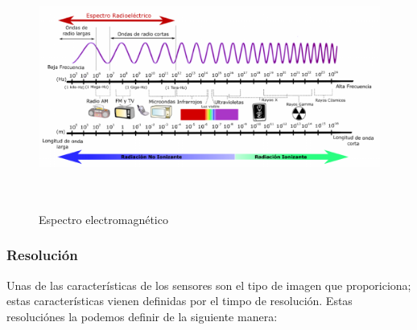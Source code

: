 \begin{figure}[H] \centering
  \includegraphics[height=8cm,keepaspectratio=true,clip=true]{imagenes/MarcoTeorico/espectro-electro.png}
  \caption{Espectro electromagnético \citep{https://iie.fing.edu.uy/proyectos/esopo/eem/}}\label{Fig:espectro-electromagnetico}
\end{figure}


\subsubsection{Resolución}
Unas de las características de los sensores son el tipo de imagen que proporiciona; estas características vienen definidas por el timpo de resolución. Estas resoluciónes la podemos definir de la siguiente manera:

